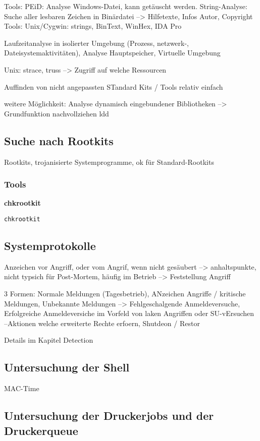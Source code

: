 Tools: PEiD: Analyse Windows-Datei, kann getäuscht werden.
String-Analyse: Suche aller lesbaren Zeichen in Binärdatei --> Hilfetexte, Infos Autor, Copyright
Tools: Unix/Cygwin: strings, BinText, WinHex, IDA Pro

Laufzeitanalyse in isolierter Umgebung (Prozess, netzwerk-, Dateisystemaktivitäten), Analyse Hauptspeicher, Virtuelle Umgebung

Unix: strace, truss --> Zugriff auf welche Ressourcen

Auffinden von nicht angepassten STandard Kits / Tools relativ einfach

weitere Möglichkeit: Analyse dynamisch eingebundener Bibliotheken --> Grundfunktion nachvollziehen
ldd

\subsection{Suche nach Rootkits}
Rootkits, trojanisierte Systemprogramme, ok für Standard-Rootkits

\subsubsection{Tools}
\textbf{chkrootkit}\\
\begin{verbatim}
chkrootkit
\end{verbatim}

\subsection{Systemprotokolle}
Anzeichen vor Angriff, oder vom Angrif, wenn nicht gesäubert --> anhaltspunkte, nicht typsich für Post-Mortem, häufig im Betrieb --> Feststellung Angriff

3 Formen: Normale Meldungen (Tagesbetrieb), ANzeichen Angriffe / kritische Meldungen, Unbekannte Meldungen
--> Fehlgeschalgende Anmeldeversuche, Erfolgreiche Anmeldeversiche im Vorfeld von laken Angriffen oder SU-vErsuchen
--Aktionen welche erweiterte Rechte erfoern, Shutdeon / Restor

Details im Kapitel Detection


\subsection{Untersuchung der Shell}
MAC-Time

\subsection{Untersuchung der Druckerjobs und der Druckerqueue}

